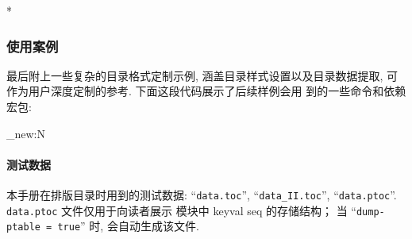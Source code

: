 \begin{DocExample}*
\listoftables
\end{DocExample}



\subsubsection{使用案例}\label{outer-toc:custom_file}
最后附上一些复杂的目录格式定制示例, 涵盖目录样式设置以及目录数据提取, 可作为用户深度定制的参考. 下面这段代码展示了后续样例会用
到的一些命令和依赖宏包:

\begin{dxample}[1]
\def\customtocthemecolor{SeaGreen}
\ExplSyntaxOn\makeatletter
\dim_new:N 
\def\tocupdatelinewidthfix{
  \dim_set:Nn \linewidthfix {\linewidth-2\fboxsep}
}
\def\ornamentcorner#1#2#3{
  \node[anchor=#1, rotate=#3, outer~sep=0pt, inner~sep=0pt] at (frame.#2)
  {\pgfornamenthan[width=.8cm, color=\customtocthemecolor]{10}};}
\def\ztochyperpage#1{\exp_args:Nne \hyper@link{link}{page.#1}{#1}}
\makeatother\ExplSyntaxOff
\end{dxample}



\paragraph{测试数据}\label{ztoc-example-data} 本手册在排版目录时用到的测试数据: ``\texttt{data.toc}'', ``\texttt{data\_II.toc}'', ``\texttt{data.ptoc}''. \texttt{data.ptoc} 文件仅用于向读者展示  模块中 keyval seq 的存储结构； 当 ``\texttt{dump-ptable = true}'' 时,
\ztex{} 会自动生成该文件.

